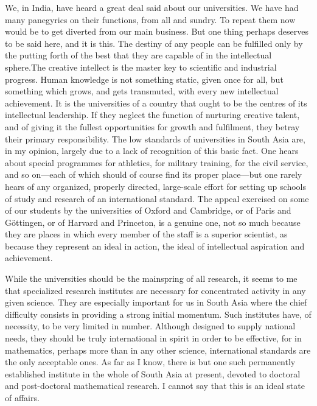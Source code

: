 We, in India, have heard a great deal said about our universities. We have had many panegyrics on their functions, from all and sundry. To repeat them now would be to get diverted from our main business. But one thing perhaps deserves to be said here, and it is this. The destiny of any people can be fulfilled only by the putting forth of the best that they are capable of in the intellectual sphere.\pageoriginale The creative intellect is the master key to scientific and industrial progress. Human knowledge is not something static, given once for all, but something which grows, and gets transmuted, with every new intellectual achievement. It is the universities of a country that ought to be the centres of its intellectual leadership. If they neglect the function of nurturing creative talent, and of giving it the fullest opportunities for growth and fulfilment, they betray their primary responsibility. The low standards of universities in South Asia are, in my opinion, largely due to a lack of recognition of this basic fact. One hears about special programmes for athletics, for military training, for the civil service, and so on---each of which should of course find its proper place---but one rarely hears of any organized, properly directed, large-scale effort for setting up schools of study and research of an international standard. The appeal exercised on some of our students by the universities of Oxford and Cambridge, or of Paris and G\"ottingen, or of Harvard and Princeton, is a genuine one, not so much because they are places in which every member of the staff is a superior scientist, as because they represent an ideal in action, the ideal of intellectual aspiration and achievement.

While the universities should be the mainspring of all research, it seems to me that specialized research institutes are necessary for concentrated activity in any given science. They are especially important for us in South Asia where the chief difficulty consists in providing a strong initial momentum. Such institutes have, of necessity, to be very limited in number. Although designed to supply national needs, they should be truly international in spirit in order to be effective, for in mathematics, perhaps more than in any other science, international standards are the only acceptable ones. As far as I know, there is but one such permanently established institute in the whole of South Asia at present, devoted to doctoral and post-doctoral mathematical research. I cannot say that this is an ideal state of affairs.

